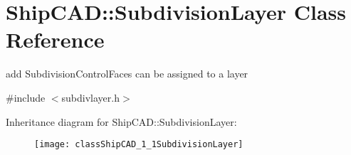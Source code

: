 \hypertarget{classShipCAD_1_1SubdivisionLayer}{}\section{Ship\+C\+AD\+:\+:Subdivision\+Layer Class Reference}
\label{classShipCAD_1_1SubdivisionLayer}


add Subdivision\+Control\+Faces can be assigned to a layer  




{\ttfamily \#include $<$subdivlayer.\+h$>$}

Inheritance diagram for Ship\+C\+AD\+:\+:Subdivision\+Layer\+:\begin{figure}[H]
\begin{center}
\leavevmode
\texttt{[image: classShipCAD\_1\_1SubdivisionLayer]}
\end{center}
\end{figure}
